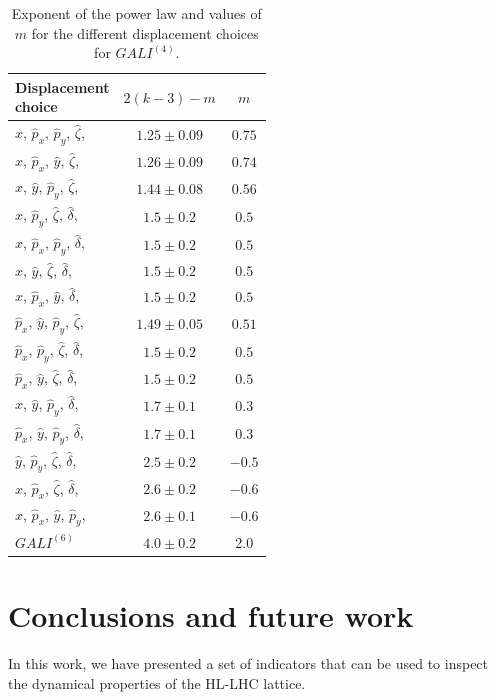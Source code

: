 \begin{table}
    \centering
    \setlength{\extrarowheight}{2pt}
    \begin{tabular}{l|cc}
        \toprule
        \makecell{Displacement\\choice} & $2(k-3)-m$ & $m$ \\
        \midrule
        $\hat{x}$, $\hat{p}_x$, $\hat{p}_y$, $\hat{\zeta}$, & $1.25 \pm 0.09$ & $0.75$ \\
        $\hat{x}$, $\hat{p}_x$, $\hat{y}$, $\hat{\zeta}$, & $1.26 \pm 0.09$ & $0.74$ \\
        $\hat{x}$, $\hat{y}$, $\hat{p}_y$, $\hat{\zeta}$, & $1.44 \pm 0.08$ & $0.56$ \\
        $\hat{x}$, $\hat{p}_y$, $\hat{\zeta}$, $\hat{\delta}$, & $1.5 \pm 0.2$ & $0.5$ \\
        $\hat{x}$, $\hat{p}_x$, $\hat{p}_y$, $\hat{\delta}$, & $1.5 \pm 0.2$ & $0.5$ \\
        $\hat{x}$, $\hat{y}$, $\hat{\zeta}$, $\hat{\delta}$, & $1.5 \pm 0.2$ & $0.5$ \\
        $\hat{x}$, $\hat{p}_x$, $\hat{y}$, $\hat{\delta}$, & $1.5 \pm 0.2$ & $0.5$ \\
        $\hat{p}_x$, $\hat{y}$, $\hat{p}_y$, $\hat{\zeta}$, & $1.49 \pm 0.05$ & $0.51$ \\
        $\hat{p}_x$, $\hat{p}_y$, $\hat{\zeta}$, $\hat{\delta}$, & $1.5 \pm 0.2$ & $0.5$ \\
        $\hat{p}_x$, $\hat{y}$, $\hat{\zeta}$, $\hat{\delta}$, & $1.5 \pm 0.2$ & $0.5$ \\
        $\hat{x}$, $\hat{y}$, $\hat{p}_y$, $\hat{\delta}$, & $1.7 \pm 0.1$ & $0.3$ \\
        $\hat{p}_x$, $\hat{y}$, $\hat{p}_y$, $\hat{\delta}$, & $1.7 \pm 0.1$ & $0.3$ \\
        $\hat{y}$, $\hat{p}_y$, $\hat{\zeta}$, $\hat{\delta}$, & $2.5 \pm 0.2$ & $-0.5$ \\
        $\hat{x}$, $\hat{p}_x$, $\hat{\zeta}$, $\hat{\delta}$, & $2.6 \pm 0.2$ & $-0.6$ \\
        $\hat{x}$, $\hat{p}_x$, $\hat{y}$, $\hat{p}_y$, & $2.6 \pm 0.1$ & $-0.6$ \\
        \midrule
        $GALI^{(6)}$ & $4.0 \pm 0.2$ &  2.0 \\   
        \bottomrule     
    \end{tabular}
    \caption{Exponent of the power law and values of $m$ for the different displacement choices for $GALI^{(4)}$.}
\end{table}


\section{Conclusions and future work}

In this work, we have presented a set of indicators that can be used to inspect the dynamical properties of the HL-LHC lattice.